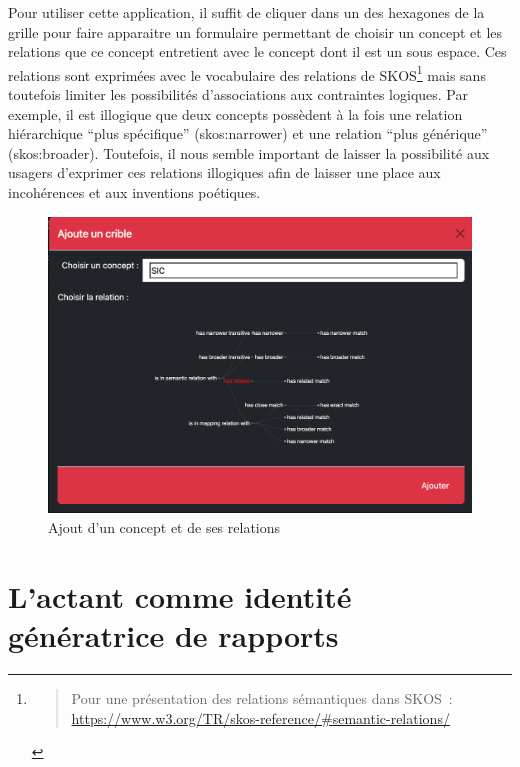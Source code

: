 \documentclass[
  letterpaper,
  DIV=11,
  numbers=noendperiod]{scrreprt}
\begin{document}
Pour utiliser cette application, il suffit de cliquer dans un des
hexagones de la grille pour faire apparaitre un formulaire permettant de
choisir un concept et les relations que ce concept entretient avec le
concept dont il est un sous espace. Ces relations sont exprimées avec le
vocabulaire des relations de SKOS\footnote{\begin{quote}
  Pour une présentation des relations sémantiques dans SKOS~:
  \url{https://www.w3.org/TR/skos-reference/\#semantic-relations/}
  \end{quote}} mais sans toutefois limiter les possibilités
d'associations aux contraintes logiques. Par exemple, il est illogique
que deux concepts possèdent à la fois une relation hiérarchique ``plus
spécifique'' (skos:narrower) et une relation ``plus générique''
(skos:broader). Toutefois, il nous semble important de laisser la
possibilité aux usagers d'exprimer ces relations illogiques afin de
laisser une place aux incohérences et aux inventions poétiques.

\begin{figure}

{\centering \includegraphics{images/localhost_samszo_HDR_docs_jdcCartoHexaAjoutCrible.html.png}

}

\caption{\label{fig-cartoHexaAjoutConcept}Ajout d'un concept et de ses
relations}

\end{figure}

\hypertarget{sec-espaceActant}{%
\section{L'actant comme identité génératrice de
rapports}\label{sec-espaceActant}}
\end{document}
